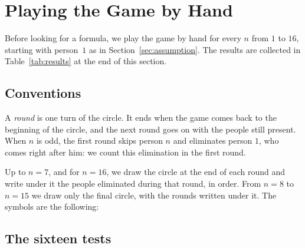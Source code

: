 \section{Playing the Game by Hand}

Before looking for a formula, we play the game by hand for every $n$ from $1$
to $16$, starting with person~$1$ as in Section~\ref{sec:assumption}. The results are
collected in Table~\ref{tab:results} at the end of this section.

\subsection{Conventions}\label{sec:conventions}

A \emph{round} is one turn of the circle. It ends when the game comes back to
the beginning of the circle, and the next round goes on with the people still
present. When $n$ is odd, the first round skips person $n$ and eliminates
person $1$, who comes right after him: we count this elimination in the first
round.

Up to $n=7$, and for $n=16$, we draw the circle at the end of each round and
write under it the people eliminated during that round, in order. From $n=8$
to $n=15$ we draw only the final circle, with the rounds written under it.
The symbols are the following:
\begin{center}
\end{center}

\subsection{The sixteen tests}

